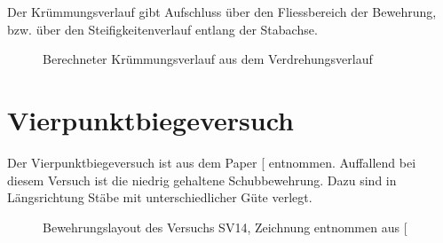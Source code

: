 \documentclass[
  11pt,
  letterpaper,
]{scrreprt}
\begin{document}
Der Krümmungsverlauf gibt Aufschluss über den Fliessbereich der
Bewehrung, bzw. über den Steifigkeitenverlauf entlang der Stabachse.

\begin{figure}[H]


\caption{\label{fig-chi-max-a3v2}Berechneter Krümmungsverlauf aus dem
Verdrehungsverlauf}

\end{figure}%

\newpage{}

\section{Vierpunktbiegeversuch}\label{vierpunktbiegeversuch}

Der Vierpunktbiegeversuch ist aus dem Paper
{[}\citeproc{ref-tue_einfluss_2019}{3}{]} entnommen. Auffallend bei
diesem Versuch ist die niedrig gehaltene Schubbewehrung. Dazu sind in
Längsrichtung Stäbe mit unterschiedlicher Güte verlegt.

\begin{figure}[H]


\caption{\label{fig-versuchsskizze-SV14}Bewehrungslayout des Versuchs
SV14, Zeichnung entnommen aus {[}\citeproc{ref-gitz_ansatze_2024}{1}{]}}

\end{figure}%
\end{document}
